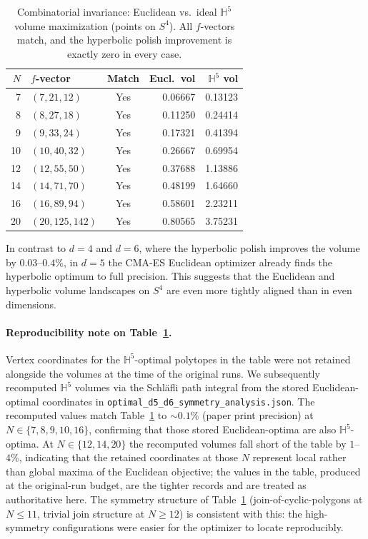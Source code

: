 \documentclass[11pt]{article}
\begin{document}
\begin{table}[ht]
\centering
\caption{Combinatorial invariance: Euclidean vs.\ ideal $\mathbb{H}^5$
volume maximization (points on $S^4$).  All $f$-vectors match,
and the hyperbolic polish improvement is exactly zero in every case.}
\label{tab:comb_H5}
\smallskip
\begin{tabular}{r l c r r}
\toprule
$N$ & $f$-vector & Match & Eucl.\ vol & $\mathbb{H}^5$ vol \\
\midrule
7  & $(7,21,12)$      & Yes & 0.06667 & 0.13123 \\
8  & $(8,27,18)$      & Yes & 0.11250 & 0.24414 \\
9  & $(9,33,24)$      & Yes & 0.17321 & 0.41394 \\
10 & $(10,40,32)$     & Yes & 0.26667 & 0.69954 \\
12 & $(12,55,50)$     & Yes & 0.37688 & 1.13886 \\
14 & $(14,71,70)$     & Yes & 0.48199 & 1.64660 \\
16 & $(16,89,94)$     & Yes & 0.58601 & 2.23211 \\
20 & $(20,125,142)$   & Yes & 0.80565 & 3.75231 \\
\bottomrule
\end{tabular}
\end{table}

In contrast to $d = 4$ and $d = 6$, where the hyperbolic polish
improves the volume by $0.03$--$0.4\%$, in $d = 5$ the CMA-ES
Euclidean optimizer already finds the hyperbolic optimum to full
precision.  This suggests that the Euclidean and hyperbolic volume
landscapes on $S^4$ are even more tightly aligned than in even
dimensions.

\paragraph{Reproducibility note on Table~\ref{tab:comb_H5}.}
Vertex coordinates for the $\mathbb{H}^5$-optimal polytopes in the
table were not retained alongside the volumes at the time of the
original runs.  We subsequently recomputed $\mathbb{H}^5$ volumes
via the Schl\"afli path integral from the stored
Euclidean-optimal coordinates in
\texttt{optimal\_d5\_d6\_symmetry\_analysis.json}.  The recomputed
values match Table~\ref{tab:comb_H5} to $\sim 0.1\%$ (paper
print precision) at $N \in \{7, 8, 9, 10, 16\}$, confirming that
those stored Euclidean-optima are also $\mathbb{H}^5$-optima.
At $N \in \{12, 14, 20\}$ the recomputed volumes fall short of
the table by $1$--$4\%$, indicating that the retained coordinates
at those $N$ represent local rather than global maxima of the
Euclidean objective; the values in the table, produced at the
original-run budget, are the tighter records and are treated as
authoritative here.  The symmetry structure of Table~\ref{tab:comb_H5}
(join-of-cyclic-polygons at $N \leq 11$, trivial join structure at
$N \geq 12$) is consistent with this: the high-symmetry
configurations were easier for the optimizer to locate
reproducibly.
\end{document}

